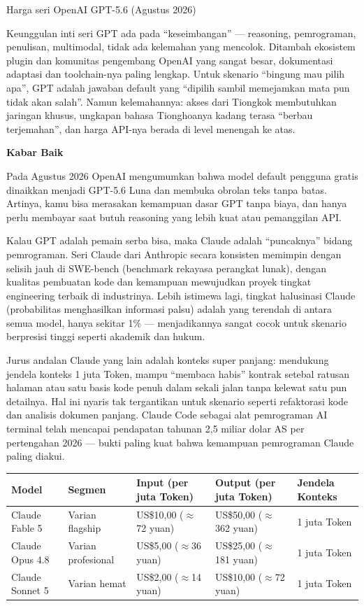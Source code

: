 \begin{center}\small\color{gray}Harga seri OpenAI GPT-5.6 (Agustus 2026)\end{center}

Keunggulan inti seri GPT ada pada “keseimbangan” — reasoning, pemrograman, penulisan, multimodal, tidak ada kelemahan yang mencolok. Ditambah ekosistem plugin dan komunitas pengembang OpenAI yang sangat besar, dokumentasi adaptasi dan toolchain-nya paling lengkap. Untuk skenario “bingung mau pilih apa”, GPT adalah jawaban default yang “dipilih sambil memejamkan mata pun tidak akan salah”. Namun kelemahannya: akses dari Tiongkok membutuhkan jaringan khusus, ungkapan bahasa Tionghoanya kadang terasa “berbau terjemahan”, dan harga API-nya berada di level menengah ke atas.

\textbf{Kabar Baik}\par

Pada Agustus 2026 OpenAI mengumumkan bahwa model default pengguna gratis dinaikkan menjadi GPT-5.6 Luna dan membuka obrolan teks tanpa batas. Artinya, kamu bisa merasakan kemampuan dasar GPT tanpa biaya, dan hanya perlu membayar saat butuh reasoning yang lebih kuat atau pemanggilan API.


Kalau GPT adalah pemain serba bisa, maka Claude adalah “puncaknya” bidang pemrograman. Seri Claude dari Anthropic secara konsisten memimpin dengan selisih jauh di SWE-bench (benchmark rekayasa perangkat lunak), dengan kualitas pembuatan kode dan kemampuan mewujudkan proyek tingkat engineering terbaik di industrinya. Lebih istimewa lagi, tingkat halusinasi Claude (probabilitas menghasilkan informasi palsu) adalah yang terendah di antara semua model, hanya sekitar 1\% — menjadikannya sangat cocok untuk skenario berpresisi tinggi seperti akademik dan hukum.

Jurus andalan Claude yang lain adalah konteks super panjang: mendukung jendela konteks 1 juta Token, mampu “membaca habis” kontrak setebal ratusan halaman atau satu basis kode penuh dalam sekali jalan tanpa kelewat satu pun detailnya. Hal ini nyaris tak tergantikan untuk skenario seperti refaktorasi kode dan analisis dokumen panjang. Claude Code sebagai alat pemrograman AI terminal telah mencapai pendapatan tahunan 2,5 miliar dolar AS per pertengahan 2026 — bukti paling kuat bahwa kemampuan pemrograman Claude paling diakui.

\begin{center}
\begin{tabularx}{\linewidth}{|X|X|X|X|X|}
\hline
\textbf{Model} & \textbf{Segmen} & \textbf{Input (per juta Token)} & \textbf{Output (per juta Token)} & \textbf{Jendela Konteks} \tabularnewline
\hline
Claude Fable 5 & Varian flagship & US\$10,00 ($\approx$72 yuan) & US\$50,00 ($\approx$362 yuan) & 1 juta Token \tabularnewline
Claude Opus 4.8 & Varian profesional & US\$5,00 ($\approx$36 yuan) & US\$25,00 ($\approx$181 yuan) & 1 juta Token \tabularnewline
Claude Sonnet 5 & Varian hemat & US\$2,00 ($\approx$14 yuan) & US\$10,00 ($\approx$72 yuan) & 1 juta Token \tabularnewline
\hline
\end{tabularx}
\end{center}

